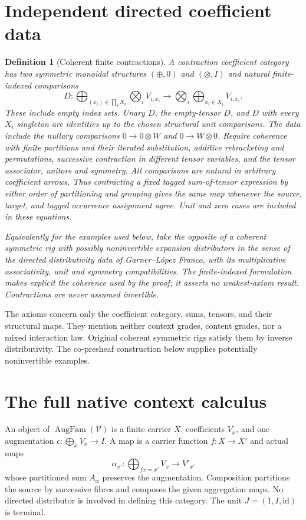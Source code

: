 \documentclass[11pt]{article}
\newtheorem{definition}[theorem]{Definition}
\newcommand{\V}{\mathcal V}
\newcommand{\Aug}{\operatorname{AugFam}}
\newcommand{\id}{\mathrm{id}}
\begin{document}
\section{Independent directed coefficient data}
\begin{definition}[Coherent finite contractions]
A contraction coefficient category has two symmetric monoidal structures $(\oplus,0)$ and $(\otimes,I)$ and natural finite-indexed comparisons
\[
 D:\bigoplus_{(x_i)\in\prod_i X_i}\bigotimes_i V_{i,x_i}
 \longrightarrow\bigotimes_i\bigoplus_{x_i\in X_i}V_{i,x_i}.
\]
These include empty index sets. Unary $D$, the empty-tensor $D$, and $D$ with every $X_i$ singleton are identities up to the chosen structural unit comparisons. The data include the nullary comparisons $0\to0\otimes W$ and $0\to W\otimes0$. Require coherence with finite partitions and their iterated substitution, additive rebracketing and permutations, successive contraction in different tensor variables, and the tensor associator, unitors and symmetry. All comparisons are natural in arbitrary coefficient arrows. Thus contracting a fixed tagged sum-of-tensor expression by either order of partitioning and grouping gives the same map whenever the source, target, and tagged occurrence assignment agree. Unit and zero cases are included in these equations.

Equivalently for the examples used below, take the opposite of a coherent symmetric rig with possibly noninvertible expansion distributors in the sense of the directed distributivity data of Garner--L\'opez Franco, with its multiplicative associativity, unit and symmetry compatibilities. The finite-indexed formulation makes explicit the coherence used by the proof; it asserts no weakest-axiom result. Contractions are never assumed invertible.
\end{definition}
The axioms concern only the coefficient category, sums, tensors, and their structural maps. They mention neither context grades, content grades, nor a mixed interaction law. Original coherent symmetric rigs satisfy them by inverse distributivity. The co-presheaf construction below supplies potentially noninvertible examples.

\section{The full native context calculus}
An object of $\Aug(\V)$ is a finite carrier $X$, coefficients $V_x$, and one augmentation $\epsilon:\bigoplus_x V_x\to I$. A map is a carrier function $f:X\to X'$ and actual maps
\[
 \alpha_{x'}:\bigoplus_{fx=x'}V_x\longrightarrow V'_{x'}
\]
whose partitioned sum $A_\alpha$ preserves the augmentation. Composition partitions the source by successive fibres and composes the given aggregation maps. No directed distributor is involved in defining this category. The unit $J=(1,I,\id)$ is terminal.
\end{document}
